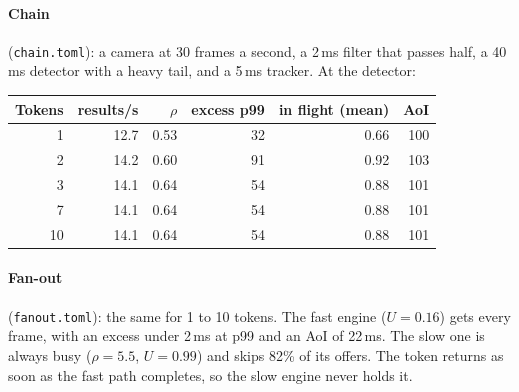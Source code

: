 \documentclass[11pt]{article}
\newcommand{\code}[1]{\texttt{#1}}
\begin{document}
\paragraph{Chain} (\code{chain.toml}): a camera at 30 frames a second, a
2\,ms filter that passes half, a 40\,ms detector with a heavy tail, and a
5\,ms tracker. At the detector:
\begin{center}
\small
\begin{tabular}{@{}rrrrrr@{}}
\toprule
Tokens & results/s & $\rho$ & excess p99 & in flight (mean) & AoI \\
\midrule
1  & 12.7 & 0.53 & 32 & 0.66 & 100 \\
2  & 14.2 & 0.60 & 91 & 0.92 & 103 \\
3  & 14.1 & 0.64 & 54 & 0.88 & 101 \\
7  & 14.1 & 0.64 & 54 & 0.88 & 101 \\
10 & 14.1 & 0.64 & 54 & 0.88 & 101 \\
\bottomrule
\end{tabular}
\end{center}

\paragraph{Fan-out} (\code{fanout.toml}): the same for 1 to 10 tokens. The
fast engine ($U = 0.16$) gets every frame, with an excess under 2\,ms at p99
and an AoI of 22\,ms. The slow one is always busy ($\rho = 5.5$, $U = 0.99$)
and skips 82\% of its offers. The token returns as soon as the fast path
completes, so the slow engine never holds it.
\end{document}
